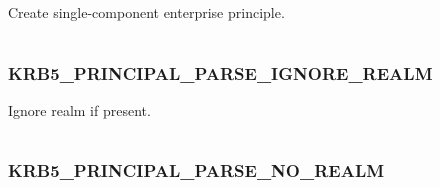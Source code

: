 \documentclass[letterpaper,10pt,english]{sphinxmanual}
\begin{document}
Create single-component enterprise principle.

\begin{tabulary}{\linewidth}{|L|L|}
\hline

 & 
\\
\hline\end{tabulary}



\subsubsection{KRB5\_PRINCIPAL\_PARSE\_IGNORE\_REALM}
\label{appdev/refs/macros/KRB5_PRINCIPAL_PARSE_IGNORE_REALM::doc}\label{appdev/refs/macros/KRB5_PRINCIPAL_PARSE_IGNORE_REALM:krb5-principal-parse-ignore-realm}\label{appdev/refs/macros/KRB5_PRINCIPAL_PARSE_IGNORE_REALM:krb5-principal-parse-ignore-realm-data}

\begin{fulllineitems}
\label{appdev/refs/macros/KRB5_PRINCIPAL_PARSE_IGNORE_REALM:KRB5_PRINCIPAL_PARSE_IGNORE_REALM}
\end{fulllineitems}


Ignore realm if present.

\begin{tabulary}{\linewidth}{|L|L|}
\hline

 & 
\\
\hline\end{tabulary}



\subsubsection{KRB5\_PRINCIPAL\_PARSE\_NO\_REALM}
\label{appdev/refs/macros/KRB5_PRINCIPAL_PARSE_NO_REALM:krb5-principal-parse-no-realm-data}\label{appdev/refs/macros/KRB5_PRINCIPAL_PARSE_NO_REALM::doc}\label{appdev/refs/macros/KRB5_PRINCIPAL_PARSE_NO_REALM:krb5-principal-parse-no-realm}

\begin{fulllineitems}
\label{appdev/refs/macros/KRB5_PRINCIPAL_PARSE_NO_REALM:KRB5_PRINCIPAL_PARSE_NO_REALM}
\end{fulllineitems}
\end{document}
